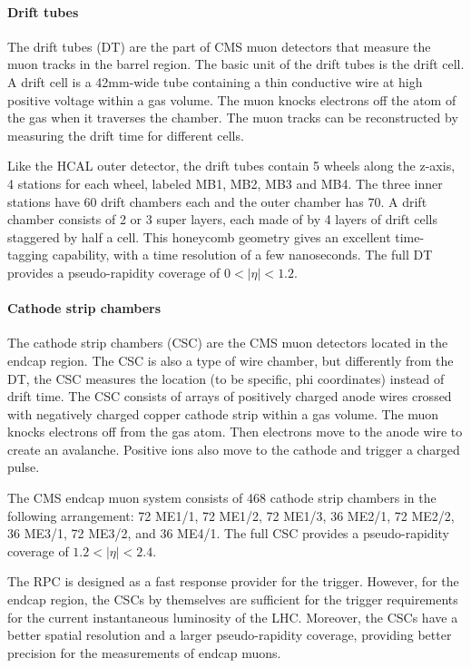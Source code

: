 \paragraph{Drift tubes}
The drift tubes (DT) are the part of CMS muon detectors that measure the muon tracks in the barrel region. The basic unit of the drift tubes is the drift cell. A drift cell is a 42mm-wide tube containing a thin conductive wire at high positive voltage within a gas volume. The muon knocks electrons off the atom of the gas when it traverses the chamber. The muon tracks can be reconstructed by measuring the drift time for different cells. 

Like the HCAL outer detector, the drift tubes contain 5 wheels along the z-axis, 4 stations for each wheel, labeled MB1, MB2, MB3 and MB4. The three inner stations have 60 drift chambers each and the outer chamber has 70. A drift chamber consists of 2 or 3 super layers, each made of by 4 layers of drift cells staggered by half a cell. This honeycomb geometry gives an excellent time-tagging capability, with a time resolution of a few nanoseconds. The full DT provides a pseudo-rapidity coverage of $0<|\eta|<1.2$.

\paragraph{Cathode strip chambers}
The cathode strip chambers (CSC) are the CMS muon detectors located in the endcap region. The CSC is also a type of wire chamber, but differently from the DT, the CSC measures the location (to be specific, phi coordinates) instead of drift time. The CSC consists of arrays of positively charged anode wires crossed with negatively charged copper cathode strip within a gas volume. The muon knocks electrons off from the gas atom. Then electrons move to the anode wire to create an avalanche. Positive ions also move to the cathode and trigger a charged pulse.

The CMS endcap muon system consists of 468 cathode strip chambers in the following arrangement: 72 ME1/1, 72 ME1/2, 72 ME1/3, 36 ME2/1, 72 ME2/2, 36 ME3/1, 72 ME3/2, and 36 ME4/1. The full CSC provides a pseudo-rapidity coverage of $1.2<|\eta|<2.4$. 

The RPC is designed as a fast response provider for the trigger. However, for the endcap region, the CSCs by themselves are sufficient for the trigger requirements for the current instantaneous luminosity of the LHC. Moreover, the CSCs have a better spatial resolution and a larger pseudo-rapidity coverage, providing better precision for the measurements of endcap muons.

